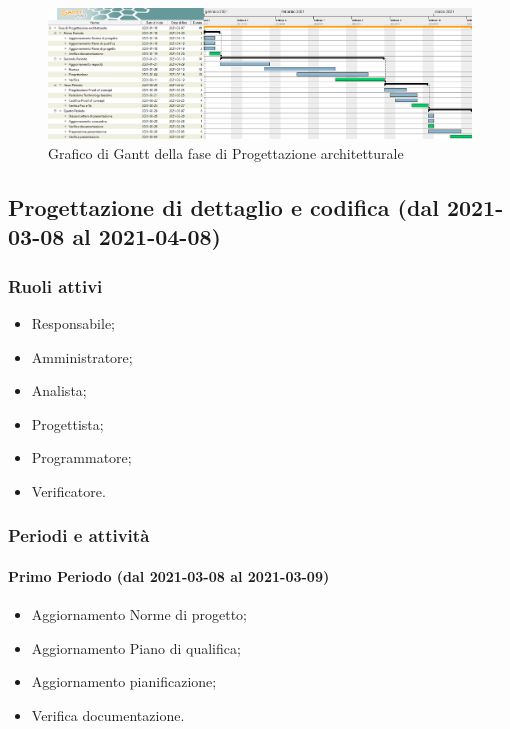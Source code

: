 \begin{landscape}
	\begin{figure}[H]
		\centering
		\includegraphics[width=\linewidth]{res/images/ganttFase2.png}
		\caption{Grafico di Gantt della fase di Progettazione architetturale}
		\label{fig:Gantt Analisi dei requisiti}
	\end{figure}
\end{landscape}

\subsection{Progettazione di dettaglio e codifica (dal 2021-03-08 al 2021-04-08)}

\subsubsection{Ruoli attivi}
\begin{itemize}
	\item Responsabile;
	\item Amministratore;
	\item Analista;
	\item Progettista;
	\item Programmatore;
	\item Verificatore.
\end{itemize}

\subsubsection{Periodi e attività}

\paragraph{Primo Periodo (dal 2021-03-08 al 2021-03-09)}
\begin{itemize}
	\item Aggiornamento Norme di progetto;
	\item Aggiornamento Piano di qualifica;
	\item Aggiornamento pianificazione;
	\item Verifica documentazione.
\end{itemize}

